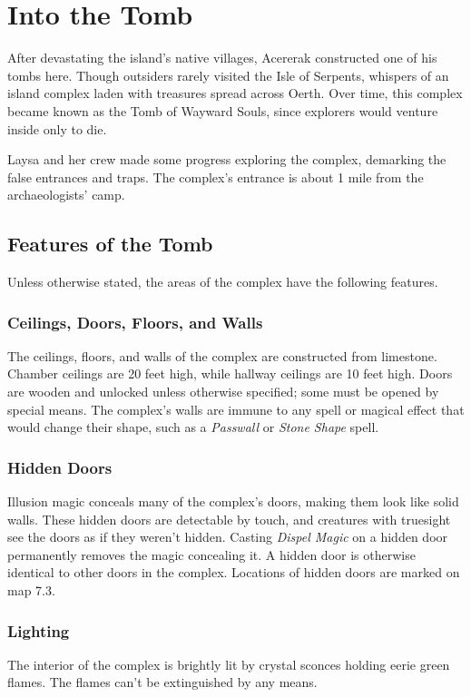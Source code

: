 \documentclass[10pt,a4paper,twoside,bg=print,twocolumn,openany,nodeprecatedcode]{dndbook}
\begin{document}
\section{Into the Tomb}
After devastating the island's native villages, Acererak constructed one of his tombs here. Though outsiders rarely visited the Isle of Serpents, whispers of an island complex laden with treasures spread across Oerth. Over time, this complex became known as the Tomb of Wayward Souls, since explorers would venture inside only to die.

Laysa and her crew made some progress exploring the complex, demarking the false entrances and traps. The complex's entrance is about 1 mile from the archaeologists' camp.

\subsection{Features of the Tomb}
Unless otherwise stated, the areas of the complex have the following features.

\subsubsection{Ceilings, Doors, Floors, and Walls}
The ceilings, floors, and walls of the complex are constructed from limestone. Chamber ceilings are 20 feet high, while hallway ceilings are 10 feet high. Doors are wooden and unlocked unless otherwise specified; some must be opened by special means. The complex's walls are immune to any spell or magical effect that would change their shape, such as a \textit{Passwall} or \textit{Stone Shape} spell.

\subsubsection{Hidden Doors}
Illusion magic conceals many of the complex's doors, making them look like solid walls. These hidden doors are detectable by touch, and creatures with truesight see the doors as if they weren't hidden. Casting \textit{Dispel Magic} on a hidden door permanently removes the magic concealing it. A hidden door is otherwise identical to other doors in the complex. Locations of hidden doors are marked on map 7.3.

\subsubsection{Lighting}
The interior of the complex is brightly lit by crystal sconces holding eerie green flames. The flames can't be extinguished by any means.
\end{document}
